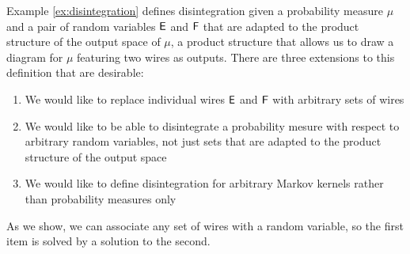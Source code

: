 Example \ref{ex:disintegration} defines disintegration given a probability measure $\mu$ and a pair of random variables $\mathsf{E}$ and $\mathsf{F}$ that are adapted to the product structure of the output space of $\mu$, a product structure that allows us to draw a diagram for $\mu$ featuring two wires as outputs. There are three extensions to this definition that are desirable:

\begin{enumerate}
\item We would like to replace individual wires $\mathsf{E}$ and $\mathsf{F}$ with arbitrary sets of wires
\item We would like to be able to disintegrate a probability mesure with respect to arbitrary random variables, not just sets that are adapted to the product structure of the output space
\item We would like to define disintegration for arbitrary Markov kernels rather than probability measures only
\end{enumerate}

As we show, we can associate any set of wires with a random variable, so the first item is solved by a solution to the second. 



